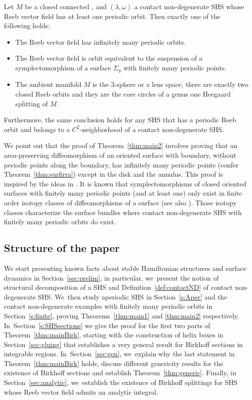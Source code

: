 \begin{thm}\label{thm:main2}
Let $M$ be a closed connected \threemanifold, and $(\lambda,\omega)$ a contact non-degenerate SHS whose Reeb vector field has at least one periodic orbit. Then exactly one of the following holds:
\begin{itemize}
\item
The Reeb vector field has infinitely many periodic orbits.
\item
The Reeb vector field is orbit equivalent to the suspension of a symplectomorphism of a surface $\Sigma_g$ with finitely many periodic points.
\item
The ambient manifold $M$ is the 3-sphere or a lens space, there are exactly two closed Reeb orbits and they are the core circles of a genus one Heegaard splitting of $M$.
\end{itemize}
Furthermore, the same conclusion holds for any SHS that has a periodic Reeb orbit and belongs to a $C^2$-neighborhood of a contact non-degenerate SHS.
\end{thm}

We point out that the proof of Theorem~\ref{thm:main2} involves proving that an area-preserving diffeomorphism of an oriented surface with boundary, without periodic points along the boundary, has infinitely many periodic points (confer Theorem~\ref{thm:surfirra}) except in the disk and the annulus. This proof is inspired by the ideas in \cite{Lec1}. It is known that symplectomorphisms of closed oriented surfaces with finitely many periodic points (and at least one) only exist in finite order isotopy classes of diffeomorphisms of a surface \cite[Ths.\,1.2 \&\,1.3]{Lec1} (see also \cite{AZT}). Those isotopy classes characterize the surface bundles where contact non-degenerate SHS with finitely many periodic orbits do exist.

\subsection{Structure of the paper} We start presenting known facts about stable Hamiltonian structures and surface dynamics in Section~\ref{sec:prelim}, in particular, we~present the notion of structural decomposition of a SHS and Definition~\ref{def:contactND} of contact non-degenerate SHS. We~then study aperiodic SHS in Section~\ref{s:Aper} and the contact non-degenerate examples with finitely many periodic orbits in Section~\ref{s:finite}, proving Theorems~\ref{thm:main1} and \ref{thm:main2} respectively. In~Section~\ref{s:SHSsections} we give the proof for the first two parts of Theorem~\ref{thm:mainBirk}, starting with the construction of helix boxes in Section~\ref{sec:gluing} that establishes a very general result for Birkhoff sections in integrable regions. In~Section~\ref{sec:gen}, we~explain why the last statement in Theorem~\ref{thm:mainBirk} holds, discuss different genericity results for the existence of Birkhoff sections and establish Theorem~\ref{thm:generic}. Finally, in Section~\ref{sec:analytic}, we~establish the existence of Birkhoff splittings for SHS whose Reeb vector field admits an analytic integral.

